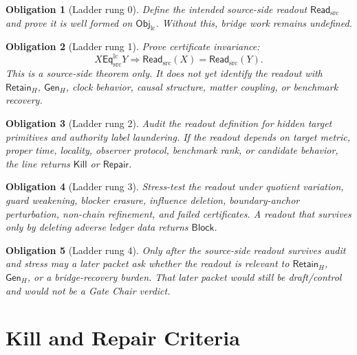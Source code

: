 \documentclass[11pt]{article}
\newcommand{\EqLC}{\mathsf{Eq}_{\mathrm{src}}^{\mathrm{lc}}}
\newcommand{\ObjLC}{\mathsf{Obj}_{\mathrm{lc}}}
\newcommand{\ReadSrc}{\mathsf{Read}_{\mathrm{src}}}
\newcommand{\RetainH}{\mathsf{Retain}_{H}}
\newcommand{\GenH}{\mathsf{Gen}_{H}}
\newcommand{\Block}{\mathsf{Block}}
\newcommand{\Kill}{\mathsf{Kill}}
\newcommand{\Repair}{\mathsf{Repair}}
\newtheorem{obligation}{Obligation}
\begin{document}
\begin{obligation}[Ladder rung 0]
Define the intended source-side readout \(\ReadSrc\) and prove it is
well formed on \(\ObjLC\). Without this, bridge work remains undefined.
\end{obligation}

\begin{obligation}[Ladder rung 1]
Prove certificate invariance:
\[
    X\EqLC Y \Longrightarrow \ReadSrc(X)=\ReadSrc(Y).
\]
This is a source-side theorem only. It does not yet identify the readout
with \(\RetainH\), \(\GenH\), clock behavior, causal structure, matter
coupling, or benchmark recovery.
\end{obligation}

\begin{obligation}[Ladder rung 2]
Audit the readout definition for hidden target primitives and authority
label laundering. If the readout depends on target metric, proper time,
locality, observer protocol, benchmark rank, or candidate behavior, the
line returns \(\Kill\) or \(\Repair\).
\end{obligation}

\begin{obligation}[Ladder rung 3]
Stress-test the readout under quotient variation, guard weakening,
blocker erasure, influence deletion, boundary-anchor perturbation,
non-chain refinement, and failed certificates. A readout that survives
only by deleting adverse ledger data returns \(\Block\).
\end{obligation}

\begin{obligation}[Ladder rung 4]
Only after the source-side readout survives audit and stress may a later
packet ask whether the readout is relevant to \(\RetainH\), \(\GenH\),
or a bridge-recovery burden. That later packet would still be
draft/control and would not be a Gate Chair verdict.
\end{obligation}

\section{Kill and Repair Criteria}
\end{document}
